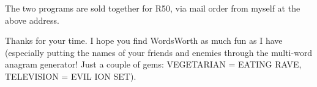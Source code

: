 The two programs are sold together for R50, via mail order 
from myself at the above address.

Thanks for your time. I hope you find WordsWorth as much fun
as I have (especially putting the names of your friends and enemies
through the multi-word anagram generator! Just a couple of gems:
VEGETARIAN = EATING RAVE, TELEVISION = EVIL ION SET).

